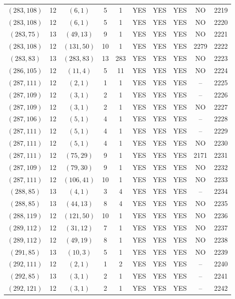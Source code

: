\begin{longtable}{|c|c|c|c|c|c|c|c|c|c|}
$(283, 108)$ & 12 & $(6, 1)$ & 5 & 1 & YES & YES & YES & NO & 2219\\
$(283, 108)$ & 12 & $(6, 1)$ & 5 & 1 & YES & YES & YES & NO & 2220\\
$(283, 75)$ & 13 & $(49, 13)$ & 9 & 1 & YES & YES & YES & NO & 2221\\
$(283, 108)$ & 12 & $(131, 50)$ & 10 & 1 & YES & YES & YES & 2279 & 2222\\
$(283, 83)$ & 13 & $(283, 83)$ & 13 & 283 & YES & YES & YES & NO & 2223\\
$(286, 105)$ & 12 & $(11, 4)$ & 5 & 11 & YES & YES & YES & NO & 2224\\
$(287, 111)$ & 12 & $(2, 1)$ & 1 & 1 & YES & YES & YES & -- & 2225\\
$(287, 109)$ & 12 & $(3, 1)$ & 2 & 1 & YES & YES & YES & -- & 2226\\
$(287, 109)$ & 12 & $(3, 1)$ & 2 & 1 & YES & YES & YES & NO & 2227\\
$(287, 106)$ & 12 & $(5, 1)$ & 4 & 1 & YES & YES & YES & -- & 2228\\
$(287, 111)$ & 12 & $(5, 1)$ & 4 & 1 & YES & YES & YES & -- & 2229\\
$(287, 111)$ & 12 & $(5, 1)$ & 4 & 1 & YES & YES & YES & NO & 2230\\
$(287, 111)$ & 12 & $(75, 29)$ & 9 & 1 & YES & YES & YES & 2171 & 2231\\
$(287, 109)$ & 12 & $(79, 30)$ & 9 & 1 & YES & YES & YES & NO & 2232\\
$(287, 111)$ & 12 & $(106, 41)$ & 10 & 1 & YES & YES & YES & NO & 2233\\
$(288, 85)$ & 13 & $(4, 1)$ & 3 & 4 & YES & YES & YES & -- & 2234\\
$(288, 85)$ & 13 & $(44, 13)$ & 8 & 4 & YES & YES & YES & NO & 2235\\
$(288, 119)$ & 12 & $(121, 50)$ & 10 & 1 & YES & YES & YES & NO & 2236\\
$(289, 112)$ & 12 & $(31, 12)$ & 7 & 1 & YES & YES & YES & NO & 2237\\
$(289, 112)$ & 12 & $(49, 19)$ & 8 & 1 & YES & YES & YES & NO & 2238\\
$(291, 85)$ & 13 & $(10, 3)$ & 5 & 1 & YES & YES & YES & NO & 2239\\
$(292, 111)$ & 12 & $(2, 1)$ & 1 & 2 & YES & YES & YES & -- & 2240\\
$(292, 85)$ & 13 & $(3, 1)$ & 2 & 1 & YES & YES & YES & -- & 2241\\
$(292, 121)$ & 12 & $(3, 1)$ & 2 & 1 & YES & YES & YES & -- & 2242\\

\end{longtable}
